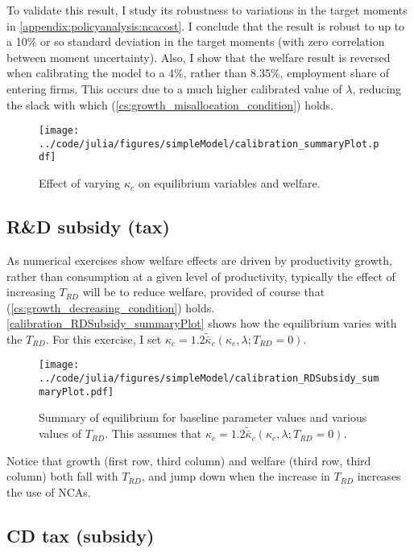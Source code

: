 \documentclass[11pt,english]{article}
\begin{document}
To validate this result, I study its robustness to variations in the target moments in \ref{appendix:policyanalysis:ncacost}. I conclude that the result is robust to up to a 10\% or so standard deviation in the target moments (with zero correlation between moment uncertainty). Also, I show that the welfare result is reversed when calibrating the model to a 4\%, rather than 8.35\%, employment share of entering firms. This occurs due to a much higher calibrated value of $\lambda$, reducing the slack with which (\ref{cs:growth_misallocation_condition}) holds.  

\begin{figure}[]
	\texttt{[image: ../code/julia/figures/simpleModel/calibration\_summaryPlot.pdf]}
	\caption{Effect of varying $\kappa_c$ on equilibrium variables and welfare.}
	\label{calibration_summaryPlot}
\end{figure}

\subsection{R\&D subsidy (tax)}

As numerical exercises show welfare effects are driven by productivity growth, rather than consumption at a given level of productivity, typically the effect of increasing $T_{RD}$ will be to reduce welfare, provided of course that (\ref{cs:growth_decreasing_condition}) holds. \autoref{calibration_RDSubsidy_summaryPlot} shows how the equilibrium varies with the $T_{RD}$. For this exercise, I set $\kappa_c = 1.2 \tilde{\bar{\kappa}}_c(\kappa_e,\lambda;T_{RD} = 0)$. 

\begin{figure}[]
	\texttt{[image: ../code/julia/figures/simpleModel/calibration\_RDSubsidy\_summaryPlot.pdf]}
	\caption{Summary of equilibrium for baseline parameter values and various values of $T_{RD}$. This assumes that $\kappa_c = 1.2 \tilde{\bar{\kappa}}_c(\kappa_e,\lambda;T_{RD} = 0)$.}
	\label{calibration_RDSubsidy_summaryPlot}
\end{figure}

Notice that growth (first row, third column) and welfare (third row, third column) both fall with $T_{RD}$, and jump down when the increase in $T_{RD}$ increases the use of NCAs.


\subsection{CD tax (subsidy)}\label{subsec:cd_tax}
\end{document}
